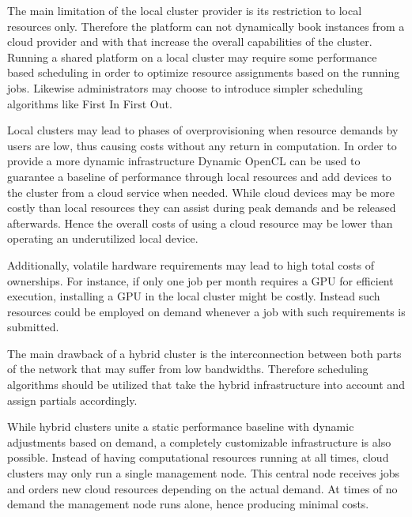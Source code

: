 \begin{description}[style=nextline]
	The main limitation of the local cluster provider is its restriction to local resources only. Therefore the platform can not dynamically book instances from a cloud provider and with that increase the overall capabilities of the cluster. Running a shared platform on a local cluster may require some performance based scheduling in order to optimize resource assignments based on the running jobs. Likewise administrators may choose to introduce simpler scheduling algorithms like First In First Out. 
	
	\item[Hybrid Cloud Provider] 
	Local clusters may lead to phases of overprovisioning when resource demands by users are low, thus causing costs without any return in computation. In order to provide a more dynamic infrastructure Dynamic OpenCL can be used to guarantee a baseline of performance through local resources and add devices to the cluster from a cloud service when needed. While cloud devices may be more costly than local resources they can assist during peak demands and be released afterwards. Hence the overall costs of using a cloud resource may be lower than operating an underutilized local device.
	
	Additionally, volatile hardware requirements may lead to high total costs of ownerships. For instance, if only one job per month requires a GPU for efficient execution, installing a GPU in the local cluster might be costly. Instead such resources could be employed on demand whenever a job with such requirements is submitted.
	
	The main drawback of a hybrid cluster is the interconnection between both parts of the network that may suffer from low bandwidths. Therefore scheduling algorithms should be utilized that take the hybrid infrastructure into account and assign partials accordingly.
	
	\item[Cloud Cluster Provider]
	While hybrid clusters unite a static performance baseline with dynamic adjustments based on demand, a completely customizable infrastructure is also possible. Instead of having computational resources running at all times, cloud clusters may only run a single management node. This central node receives jobs and orders new cloud resources depending on the actual demand. At times of no demand the management node runs alone, hence producing minimal costs.
	
	
\end{description}

